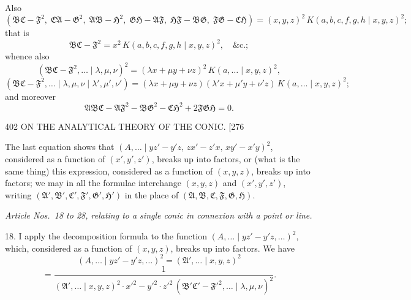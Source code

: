 \documentclass[11pt]{article}
\begin{document}
Also
\[ (\mathfrak{B}\mathfrak{C}-\mathfrak{F}^{2},\;\mathfrak{C}\mathfrak{A}-\mathfrak{G}^{2},\;\mathfrak{A}\mathfrak{B}-\mathfrak{H}^{2},\;\mathfrak{G}\mathfrak{H}-\mathfrak{A}\mathfrak{F},\;\mathfrak{H}\mathfrak{F}-\mathfrak{B}\mathfrak{G},\;\mathfrak{F}\mathfrak{G}-\mathfrak{C}\mathfrak{H})
=(x,y,z)^{2}\,K(a,b,c,f,g,h \mid x,y,z)^{2}; \]
that is
\[ \mathfrak{B}\mathfrak{C}-\mathfrak{F}^{2}=x^{2}\,K(a,b,c,f,g,h \mid x,y,z)^{2},\quad \&\mathrm{c}.; \]
whence also
\[ (\mathfrak{B}\mathfrak{C}-\mathfrak{F}^{2},\dots \mid \lambda,\mu,\nu)^{2}=(\lambda x+\mu y+\nu z)^{2}\,K(a,\dots \mid x,y,z)^{2}, \]
\[ (\mathfrak{B}\mathfrak{C}-\mathfrak{F}^{2},\dots \mid \lambda,\mu,\nu \mid \lambda',\mu',\nu')
=(\lambda x+\mu y+\nu z)(\lambda' x+\mu' y+\nu' z)\,K(a,\dots \mid x,y,z)^{2}; \]
and moreover
\[ \mathfrak{A}\mathfrak{B}\mathfrak{C}-\mathfrak{A}\mathfrak{F}^{2}-\mathfrak{B}\mathfrak{G}^{2}-\mathfrak{C}\mathfrak{H}^{2}+2\mathfrak{F}\mathfrak{G}\mathfrak{H}=0. \]

\begin{center}
402 \hfill ON THE ANALYTICAL THEORY OF THE CONIC. \hfill \textsc{[276}
\end{center}

The last equation shows that $(A,\dots \mid yz'-y'z,\,zx'-z'x,\,xy'-x'y)^{2}$, considered as a
function of $(x',y',z')$, breaks up into factors, or (what is the same thing) this
expression, considered as a function of $(x,y,z)$, breaks up into factors; we may in all
the formulae interchange $(x,y,z)$ and $(x',y',z')$, writing $(\mathfrak{A}',\mathfrak{B}',\mathfrak{C}',\mathfrak{F}',\mathfrak{G}',\mathfrak{H}')$ in the
place of $(\mathfrak{A},\mathfrak{B},\mathfrak{C},\mathfrak{F},\mathfrak{G},\mathfrak{H})$.

\medskip
\centerline{\textit{Article Nos.~18 to 28, relating to a single conic in connexion with a point or line.}}
\medskip

\textsc{18.} I apply the decomposition formula to the function $(A,\dots \mid yz'-y'z,\dots)^{2}$, which,
considered as a function of $(x,y,z)$, breaks up into factors. We have
\[ (A,\dots \mid yz'-y'z,\dots)^{2}=(\mathfrak{A}',\dots \mid x,y,z)^{2} \]
\[ =\frac{1}{(\mathfrak{A}',\dots \mid x,y,z)^{2}\cdot x'^{2}-y'^{2}\cdot z'^{2}\,(\mathfrak{B}'\mathfrak{C}'-\mathfrak{F}'^{2},\dots \mid \lambda,\mu,\nu)^{2}}. \]
\end{document}
